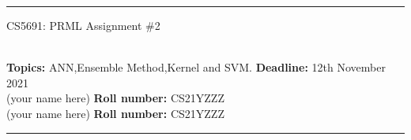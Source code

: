 \documentclass[addpoints,12pt,solution]{exam}
\begin{document}
\hrule
\vspace{1mm}
\noindent 
\begin{center}
{\Large CS5691: PRML Assignment \#2} \\


\end{center}
 \\ 
\noindent \small{\textbf{Topics:} ANN,Ensemble Method,Kernel and SVM. \hfill \textbf{Deadline:} 12th November 2021} \\


 (your name here) \hfill {\bf Roll number:} CS21YZZZ \\
 (your name here) \hfill {\bf Roll number:} CS21YZZZ \\
\vspace{2mm}
\hrule
\end{document}
